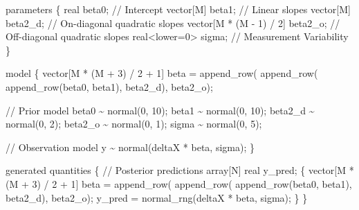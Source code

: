 \documentclass[
  letterpaper,
  DIV=11,
  numbers=noendperiod]{scrartcl}
\newenvironment{Shaded}{\begin{snugshade}}{\end{snugshade}}
\newcommand{\CommentTok}[1]{\textcolor[rgb]{0.37,0.37,0.37}{#1}}
\newcommand{\DataTypeTok}[1]{\textcolor[rgb]{0.68,0.00,0.00}{#1}}
\newcommand{\DecValTok}[1]{\textcolor[rgb]{0.68,0.00,0.00}{#1}}
\newcommand{\KeywordTok}[1]{\textcolor[rgb]{0.00,0.23,0.31}{#1}}
\newcommand{\NormalTok}[1]{\textcolor[rgb]{0.00,0.23,0.31}{#1}}
\begin{document}
\begin{codelisting}
\begin{Shaded}
\begin{Highlighting}[]
\KeywordTok{parameters}\NormalTok{ \{}
  \DataTypeTok{real}\NormalTok{ beta0;                      }\CommentTok{// Intercept}
  \DataTypeTok{vector}\NormalTok{[M] beta1;                 }\CommentTok{// Linear slopes}
  \DataTypeTok{vector}\NormalTok{[M] beta2\_d;               }\CommentTok{// On{-}diagonal quadratic slopes}
  \DataTypeTok{vector}\NormalTok{[M * (M {-} }\DecValTok{1}\NormalTok{) / }\DecValTok{2}\NormalTok{] beta2\_o; }\CommentTok{// Off{-}diagonal quadratic slopes}
  \DataTypeTok{real}\NormalTok{\textless{}}\KeywordTok{lower}\NormalTok{=}\DecValTok{0}\NormalTok{\textgreater{} sigma;             }\CommentTok{// Measurement Variability}
\NormalTok{\}}

\KeywordTok{model}\NormalTok{ \{}
  \DataTypeTok{vector}\NormalTok{[M * (M + }\DecValTok{3}\NormalTok{) / }\DecValTok{2}\NormalTok{ + }\DecValTok{1}\NormalTok{] beta}
\NormalTok{    = append\_row(}
\NormalTok{        append\_row(}
\NormalTok{          append\_row(beta0, beta1), }
\NormalTok{        beta2\_d), }
\NormalTok{      beta2\_o);}
  
  \CommentTok{// Prior model}
\NormalTok{  beta0 \textasciitilde{} normal(}\DecValTok{0}\NormalTok{, }\DecValTok{10}\NormalTok{);}
\NormalTok{  beta1 \textasciitilde{} normal(}\DecValTok{0}\NormalTok{, }\DecValTok{10}\NormalTok{);}
\NormalTok{  beta2\_d \textasciitilde{} normal(}\DecValTok{0}\NormalTok{, }\DecValTok{2}\NormalTok{);}
\NormalTok{  beta2\_o \textasciitilde{} normal(}\DecValTok{0}\NormalTok{, }\DecValTok{1}\NormalTok{);}
\NormalTok{  sigma \textasciitilde{} normal(}\DecValTok{0}\NormalTok{, }\DecValTok{5}\NormalTok{);}

  \CommentTok{// Observation model}
\NormalTok{  y \textasciitilde{} normal(deltaX * beta, sigma);}
\NormalTok{\}}

\KeywordTok{generated quantities}\NormalTok{ \{}
  \CommentTok{// Posterior predictions}
  \DataTypeTok{array}\NormalTok{[N] }\DataTypeTok{real}\NormalTok{ y\_pred;}
\NormalTok{  \{}
    \DataTypeTok{vector}\NormalTok{[M * (M + }\DecValTok{3}\NormalTok{) / }\DecValTok{2}\NormalTok{ + }\DecValTok{1}\NormalTok{] beta}
\NormalTok{      = append\_row(}
\NormalTok{          append\_row(}
\NormalTok{            append\_row(beta0, beta1), }
\NormalTok{          beta2\_d),}
\NormalTok{        beta2\_o);}
\NormalTok{    y\_pred = normal\_rng(deltaX * beta, sigma);}
\NormalTok{  \}}
\NormalTok{\}}
\end{Highlighting}
\end{Shaded}

\end{codelisting}
\end{document}
